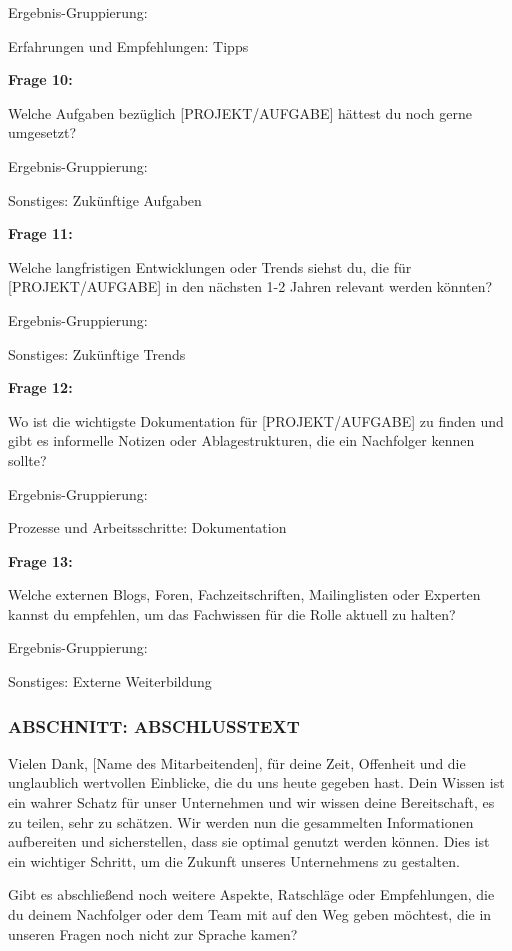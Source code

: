 \documentclass[
  10pt,
  ngerman,
  a4paper,
  toc=graduated,
  numbers=noenddot,
  headings=standardclasses,
  nonumberlist
]{scrartcl}
\begin{document}
Ergebnis-Gruppierung:

Erfahrungen und Empfehlungen: Tipps

\textbf{Frage 10:}

Welche Aufgaben bezüglich [PROJEKT/AUFGABE] hättest du noch gerne umgesetzt?

Ergebnis-Gruppierung:

Sonstiges: Zukünftige Aufgaben

\textbf{Frage 11:}

Welche langfristigen Entwicklungen oder Trends siehst du, die für [PROJEKT/AUFGABE] in den nächsten 1-2 Jahren relevant werden könnten?

Ergebnis-Gruppierung:

Sonstiges: Zukünftige Trends

\textbf{Frage 12:}

Wo ist die wichtigste Dokumentation für [PROJEKT/AUFGABE] zu finden und gibt es informelle Notizen oder Ablagestrukturen, die ein Nachfolger kennen sollte?

Ergebnis-Gruppierung:

Prozesse und Arbeitsschritte: Dokumentation

\textbf{Frage 13:}

Welche externen Blogs, Foren, Fachzeitschriften, Mailinglisten oder Experten kannst du empfehlen, um das Fachwissen für die Rolle aktuell zu halten?

Ergebnis-Gruppierung:

Sonstiges: Externe Weiterbildung

\subsubsection*{ABSCHNITT: ABSCHLUSSTEXT}

Vielen Dank, [Name des Mitarbeitenden], für deine Zeit, Offenheit und die unglaublich wertvollen Einblicke, die du uns heute gegeben hast. Dein Wissen ist ein wahrer Schatz für unser Unternehmen und wir wissen deine Bereitschaft, es zu teilen, sehr zu schätzen. Wir werden nun die gesammelten Informationen aufbereiten und sicherstellen, dass sie optimal genutzt werden können. Dies ist ein wichtiger Schritt, um die Zukunft unseres Unternehmens zu gestalten.

Gibt es abschließend noch weitere Aspekte, Ratschläge oder Empfehlungen, die du deinem Nachfolger oder dem Team mit auf den Weg geben möchtest, die in unseren Fragen noch nicht zur Sprache kamen?
\end{document}
